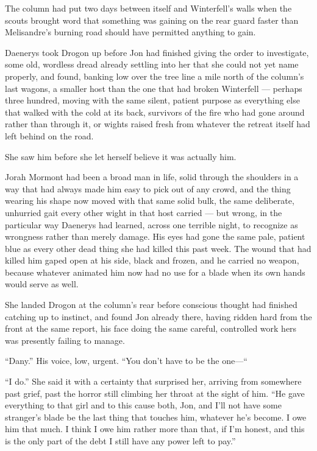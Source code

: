 The column had put two days between itself and Winterfell’s walls when the scouts brought word that something was gaining on the rear guard faster than Melisandre’s burning road should have permitted anything to gain.

Daenerys took Drogon up before Jon had finished giving the order to investigate, some old, wordless dread already settling into her that she could not yet name properly, and found, banking low over the tree line a mile north of the column’s last wagons, a smaller host than the one that had broken Winterfell — perhaps three hundred, moving with the same silent, patient purpose as everything else that walked with the cold at its back, survivors of the fire who had gone around rather than through it, or wights raised fresh from whatever the retreat itself had left behind on the road.

She saw him before she let herself believe it was actually him.

\sceneBreak

Jorah Mormont had been a broad man in life, solid through the shoulders in a way that had always made him easy to pick out of any crowd, and the thing wearing his shape now moved with that same solid bulk, the same deliberate, unhurried gait every other wight in that host carried — but wrong, in the particular way Daenerys had learned, across one terrible night, to recognize as wrongness rather than merely damage. His eyes had gone the same pale, patient blue as every other dead thing she had killed this past week. The wound that had killed him gaped open at his side, black and frozen, and he carried no weapon, because whatever animated him now had no use for a blade when its own hands would serve as well.

She landed Drogon at the column’s rear before conscious thought had finished catching up to instinct, and found Jon already there, having ridden hard from the front at the same report, his face doing the same careful, controlled work hers was presently failing to manage.

“Dany.” His voice, low, urgent. “You don’t have to be the one—“

“I do.” She said it with a certainty that surprised her, arriving from somewhere past grief, past the horror still climbing her throat at the sight of him. “He gave everything to that girl and to this cause both, Jon, and I’ll not have some stranger’s blade be the last thing that touches him, whatever he’s become. I owe him that much. I think I owe him rather more than that, if I’m honest, and this is the only part of the debt I still have any power left to pay.”

